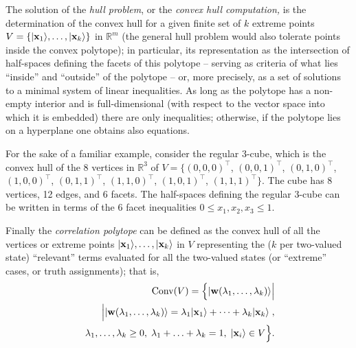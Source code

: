 The solution of the  {\em hull problem}, or the
{\em convex hull computation,}
is the determination of the convex hull for a given finite set of
$k$ extreme points $V = \{ \vert  {\bf x}_1 \rangle  , \ldots , \vert  {\bf x}_k \rangle \}$ in $\mathbb{R}^m$
(the general hull problem would also tolerate points inside the convex polytope);
in particular, its representation as the intersection of half-spaces defining the facets of this polytope
-- serving as criteria of what lies ``inside'' and ``outside'' of the polytope -- or,
more precisely, as a set of solutions to a minimal system of linear inequalities.
As long as the polytope has a non-empty interior and is full-dimensional
(with respect to the vector space into which it is embedded)
 there are only inequalities;
otherwise, if the polytope lies on a hyperplane one obtains also equations.


For the sake of a familiar example, consider the regular 3-cube,
which is the convex hull of the 8 vertices in  $\mathbb{R}^3$  of
$V= \big\{
\left(0, 0, 0\right)^\intercal$,   $
\left(0, 0, 1\right)^\intercal$,   $
\left(0, 1, 0\right)^\intercal$,   $
\left(1, 0, 0\right)^\intercal$,   $
\left(0, 1, 1\right)^\intercal$,   $
\left(1, 1, 0\right)^\intercal$,   $
\left(1, 0, 1\right)^\intercal$,   $
\left(1, 1, 1\right)^\intercal
\big\}
$.
The cube has 8 vertices, 12 edges, and 6 facets.
The half-spaces defining the  regular 3-cube can be written in terms of the 6 facet inequalities
$0 \le x_1,x_2,x_3 \le 1$.



Finally the {\em correlation polytope} can be defined
as the convex hull of all the vertices or extreme points
$\vert  {\bf x}_1 \rangle , \ldots , \vert  {\bf x}_k \rangle$
in $V$
representing the ($k$ per two-valued state) ``relevant'' terms  evaluated for all the two-valued states
(or ``extreme'' cases, or truth assignments); that is,
\begin{equation}
\begin{split}
\text{Conv}(V) =\Big\{
\vert {\bf w} ( \lambda_1 ,\ldots , \lambda_k ) \rangle
\Big| \\   \Big|
\vert {\bf w} ( \lambda_1 ,\ldots , \lambda_k ) \rangle
=
\lambda_1 \vert  {\bf x}_1 \rangle  + \cdots + \lambda_k \vert  {\bf x}_k \rangle  \;  ,
\\     \;
\lambda_1, \ldots , \lambda_k  \ge 0 ,
\;
\lambda_1 + \ldots + \lambda_k   = 1   ,
\;
\vert  {\bf x}_i \rangle \in V
\Big\}
.
\label{2017-b-correlationpolytope}
\end{split}
\end{equation}

